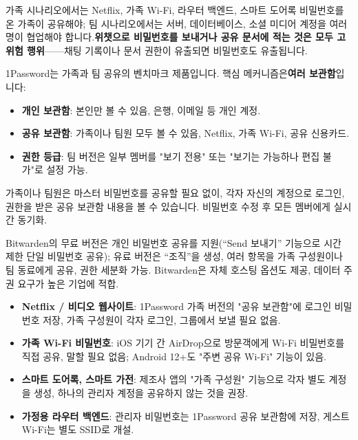 
가족 시나리오에서는 Netflix, 가족 Wi-Fi, 라우터 백엔드, 스마트 도어록 비밀번호를 온 가족이 공유해야; 팀 시나리오에서는 서버, 데이터베이스, 소셜 미디어 계정을 여러 명이 협업해야 합니다.\textbf{위챗으로 비밀번호를 보내거나 공유 문서에 적는 것은 모두 고위험 행위}——채팅 기록이나 문서 권한이 유출되면 비밀번호도 유출됩니다.


1Password는 가족과 팀 공유의 벤치마크 제품입니다. 핵심 메커니즘은\textbf{여러 보관함}입니다:

\begin{itemize}
  \item \textbf{개인 보관함}: 본인만 볼 수 있음, 은행, 이메일 등 개인 계정.
  \item \textbf{공유 보관함}: 가족이나 팀원 모두 볼 수 있음, Netflix, 가족 Wi-Fi, 공유 신용카드.
  \item \textbf{권한 등급}: 팀 버전은 일부 멤버를 "보기 전용" 또는 "보기는 가능하나 편집 불가"로 설정 가능.
\end{itemize}

가족이나 팀원은 마스터 비밀번호를 공유할 필요 없이, 각자 자신의 계정으로 로그인, 권한을 받은 공유 보관함 내용을 볼 수 있습니다. 비밀번호 수정 후 모든 멤버에게 실시간 동기화.


Bitwarden의 무료 버전은 개인 비밀번호 공유를 지원(“Send 보내기” 기능으로 시간 제한 단일 비밀번호 공유); 유료 버전은 “조직”을 생성, 여러 항목을 가족 구성원이나 팀 동료에게 공유, 권한 세분화 가능. Bitwarden은 자체 호스팅 옵션도 제공, 데이터 주권 요구가 높은 기업에 적합.


\begin{itemize}
  \item \textbf{Netflix / 비디오 웹사이트}: 1Password 가족 버전의 "공유 보관함"에 로그인 비밀번호 저장, 가족 구성원이 각자 로그인, 그룹에서 보낼 필요 없음.
  \item \textbf{가족 Wi-Fi 비밀번호}: iOS 기기 간 AirDrop으로 방문객에게 Wi-Fi 비밀번호를 직접 공유, 말할 필요 없음; Android 12+도 "주변 공유 Wi-Fi" 기능이 있음.
  \item \textbf{스마트 도어록, 스마트 가전}: 제조사 앱의 "가족 구성원" 기능으로 각자 별도 계정을 생성, 하나의 관리자 계정을 공유하지 않는 것을 권장.
  \item \textbf{가정용 라우터 백엔드}: 관리자 비밀번호는 1Password 공유 보관함에 저장, 게스트 Wi-Fi는 별도 SSID로 개설.
\end{itemize}

